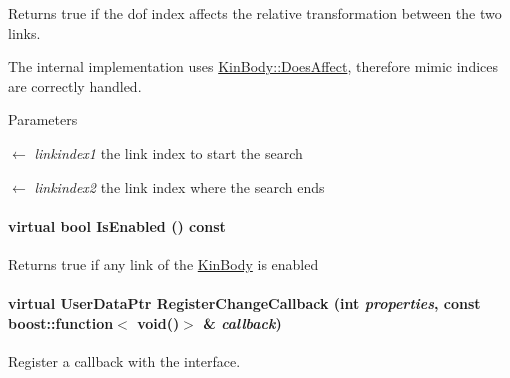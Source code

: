 Returns true if the dof index affects the relative transformation between the two links. 

The internal implementation uses \hyperlink{classOpenRAVE_1_1KinBody_ae63c68d8042f54cfb86ef6b52827cb69}{KinBody::DoesAffect}, therefore mimic indices are correctly handled. 
\begin{DoxyParams}{Parameters}
\item[\mbox{$\leftarrow$} {\em linkindex1}]the link index to start the search \item[\mbox{$\leftarrow$} {\em linkindex2}]the link index where the search ends \end{DoxyParams}
\hypertarget{classOpenRAVE_1_1KinBody_ab093c91e2859f12d929fe8665e67a8e8}{
\paragraph[{IsEnabled}]{\setlength{\rightskip}{0pt plus 5cm}virtual bool IsEnabled () const}\hfill}
\label{classOpenRAVE_1_1KinBody_ab093c91e2859f12d929fe8665e67a8e8}
\begin{DoxyReturn}{Returns}
true if any link of the \hyperlink{classOpenRAVE_1_1KinBody}{KinBody} is enabled 
\end{DoxyReturn}
\hypertarget{classOpenRAVE_1_1KinBody_a4f3de0f5a2b97c622ae9e4ea774cf30d}{
\paragraph[{RegisterChangeCallback}]{\setlength{\rightskip}{0pt plus 5cm}virtual UserDataPtr RegisterChangeCallback (int {\em properties}, \/  const boost::function$<$ void()$>$ \& {\em callback})}\hfill}
\label{classOpenRAVE_1_1KinBody_a4f3de0f5a2b97c622ae9e4ea774cf30d}


Register a callback with the interface. 

